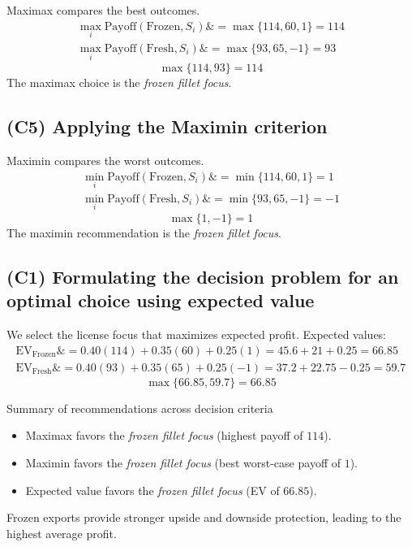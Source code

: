 \documentclass[11pt]{article}
\begin{document}
	\hypertarget{problem11-c4}{}
	
	Maximax compares the best outcomes.
	\[
	\begin{aligned}
		\max_i \text{Payoff}(\text{Frozen}, S_i) \&= \max\{114, 60, 1\} = 114 \\
		\max_i \text{Payoff}(\text{Fresh}, S_i) \&= \max\{93, 65, -1\} = 93
	\end{aligned}
	\]
	\[
	\max\{114, 93\} = 114
	\]
	The maximax choice is the \emph{frozen fillet focus}.
	
	\subsection*{(C5) Applying the Maximin criterion}
	
	\hypertarget{problem11-c5}{}
	
	Maximin compares the worst outcomes.
	\[
	\begin{aligned}
		\min_i \text{Payoff}(\text{Frozen}, S_i) \&= \min\{114, 60, 1\} = 1 \\
		\min_i \text{Payoff}(\text{Fresh}, S_i) \&= \min\{93, 65, -1\} = -1
	\end{aligned}
	\]
	\[
	\max\{1, -1\} = 1
	\]
	The maximin recommendation is the \emph{frozen fillet focus}.
	
	\subsection*{(C1) Formulating the decision problem for an optimal choice using expected value}
	
	\hypertarget{problem11-c1}{}
	
	We select the license focus that maximizes expected profit. Expected values:
	\[
	\begin{aligned}
		\mathrm{EV}_{\text{Frozen}} \&= 0.40(114) + 0.35(60) + 0.25(1) = 45.6 + 21 + 0.25 = 66.85 \\
		\mathrm{EV}_{\text{Fresh}} \&= 0.40(93) + 0.35(65) + 0.25(-1) = 37.2 + 22.75 - 0.25 = 59.7
	\end{aligned}
	\]
	\[
	\max\{66.85, 59.7\} = 66.85
	\]
	
	Summary of recommendations across decision criteria
	\begin{itemize}
		\item Maximax favors the \emph{frozen fillet focus} (highest payoff of $114$).
		\item Maximin favors the \emph{frozen fillet focus} (best worst-case payoff of $1$).
		\item Expected value favors the \emph{frozen fillet focus} (EV of $66.85$).
	\end{itemize}
	
	Frozen exports provide stronger upside and downside protection, leading to the highest average profit.
	
\end{document}
